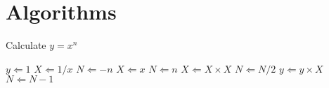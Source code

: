 \newpage

\section{Algorithms}




\begin{algorithm} %
\caption{Calculate $y = x^n$} %
\label{alg1} %
\begin{algorithmic} %
    \State $y \Leftarrow 1$
        \State $X \Leftarrow 1 / x$
        \State $N \Leftarrow -n$
    \Else
        \State $X \Leftarrow x$
        \State $N \Leftarrow n$
    \EndIf
            \State $X \Leftarrow X \times X$
            \State $N \Leftarrow N / 2$
            \State $y \Leftarrow y \times X$
            \State $N \Leftarrow N - 1$
        \EndIf
    \EndWhile
\end{algorithmic}
\end{algorithm}
